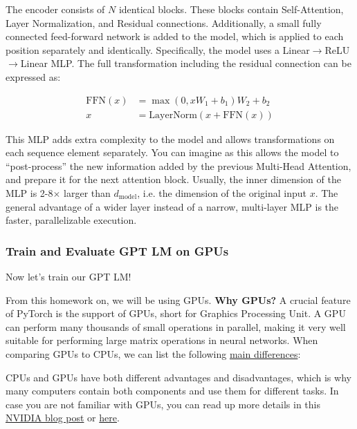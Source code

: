 The encoder consists of $N$ identical blocks. These blocks contain Self-Attention, Layer Normalization, and Residual connections. Additionally, a small fully connected feed-forward network is added to the model, which is applied to each position separately and identically.
Specifically, the model uses a Linear$\to$ReLU$\to$Linear MLP.
The full transformation including the residual connection can be expressed as:

\begin{align}
    \text{FFN}(x) & = \max(0, xW_1+b_1)W_2 + b_2\\
    x & = \text{LayerNorm}(x + \text{FFN}(x))
\end{align}


This MLP adds extra complexity to the model and allows transformations on each sequence element separately.
You can imagine as this allows the model to ``post-process'' the new information added by the previous Multi-Head Attention, and prepare it for the next attention block.
Usually, the inner dimension of the MLP is 2-8$\times$ larger than $d_{\text{model}}$,
i.e. the dimension of the original input $x$.
The general advantage of a wider layer instead of a narrow, multi-layer MLP is the faster, parallelizable execution.

\subsubsection{Train and Evaluate GPT LM on GPUs}
\label{subsubsec:gpu}
\noindent Now let's train our GPT LM!

From this homework on, we will be using GPUs. 
\noindent \textbf{Why GPUs?}
A crucial feature of PyTorch is the support of GPUs, short for Graphics Processing Unit. A GPU can perform many thousands of small operations in parallel, making it very well suitable for performing large matrix operations in neural networks. When comparing GPUs to CPUs, we can list the following \href{https://blogs.nvidia.com/blog/2009/12/16/whats-the-difference-between-a-cpu-and-a-gpu/}{main differences}:

CPUs and GPUs have both different advantages and disadvantages, which is why many computers contain both components and use them for different tasks. In case you are not familiar with GPUs, you can read up more details in this \href{https://blogs.nvidia.com/blog/2009/12/16/whats-the-difference-between-a-cpu-and-a-gpu/}{NVIDIA blog post} or \href{https://www.intel.com/content/www/us/en/products/docs/processors/what-is-a-gpu.html}{here}. 

